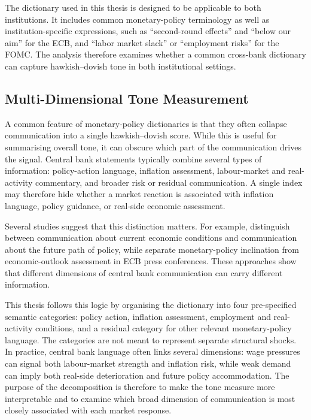 The dictionary used in this thesis is designed to be applicable to both
institutions. It includes common monetary-policy terminology as well as
institution-specific expressions, such as ``second-round effects'' and
``below our aim'' for the ECB, and ``labor market slack'' or
``employment risks'' for the FOMC. The analysis therefore examines
whether a common cross-bank dictionary can capture hawkish--dovish tone
in both institutional settings.
 
\subsection{Multi-Dimensional Tone Measurement}
\label{sec:lit_multidim}
 
A common feature of monetary-policy dictionaries is that they often
collapse communication into a single hawkish--dovish score. While this
is useful for summarising overall tone, it can obscure which part of the
communication drives the signal. Central bank statements typically
combine several types of information: policy-action language, inflation
assessment, labour-market and real-activity commentary, and broader risk
or residual communication. A single index may therefore hide whether a
market reaction is associated with inflation language, policy guidance,
or real-side economic assessment.

Several studies suggest that this distinction matters. For example,
\citet{hansen2016} distinguish between communication about current
economic conditions and communication about the future path of policy,
while \citet{picault2017} separate monetary-policy inclination from
economic-outlook assessment in ECB press conferences. These approaches
show that different dimensions of central bank communication can carry
different information.

This thesis follows this logic by organising the dictionary into four
pre-specified semantic categories: policy action, inflation assessment,
employment and real-activity conditions, and a residual category for
other relevant monetary-policy language. The categories are not meant to
represent separate structural shocks. In practice, central bank language
often links several dimensions: wage pressures can signal both
labour-market strength and inflation risk, while weak demand can imply
both real-side deterioration and future policy accommodation. The purpose
of the decomposition is therefore to make the tone measure more
interpretable and to examine which broad dimension of communication is
most closely associated with each market response.
 

